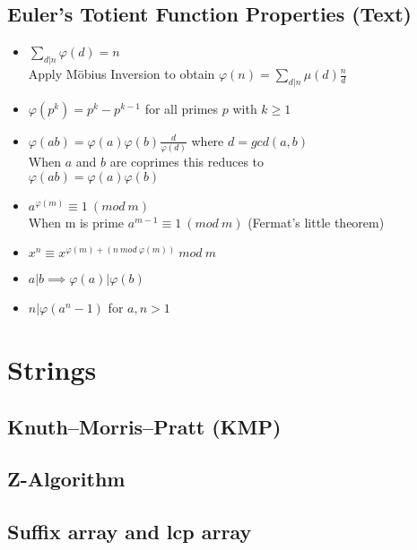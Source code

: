 \documentclass[9pt]{extarticle}
\begin{document}
\begin{multicols*}{3}
\subsection{Euler's Totient Function Properties (Text)}
\begin{itemize}
\item $\displaystyle \sum_{d|n} \varphi(d) = n$ \\
Apply M\"obius Inversion to obtain $\displaystyle \varphi(n) = \sum_{d|n} \mu(d)\frac{n}{d}$
\item $\varphi(p^k) = p^k - p^{k-1}$ for all primes $p$ with $k \geq 1$
\item $\varphi(ab) = \varphi(a)\varphi(b)\frac{d}{\varphi(d)}$ where $d = gcd(a, b)$ \\
When $a$ and $b$ are coprimes this reduces to \\
$\varphi(ab) = \varphi(a)\varphi(b)$
\item $a^{\varphi(m)} \equiv 1 \ (mod \ m)$ \\
When m is prime $a^{m-1} \equiv 1 \ (mod \ m)$ (Fermat's little theorem)
\item $x^n \equiv x^{\varphi(m) + (n \ mod \ \varphi(m))} \ mod \ m$
\item $a | b \implies \varphi(a) | \varphi(b)$
\item $n | \varphi(a^n - 1)$ for $a, n > 1$
\end{itemize}

\section{Strings}

\subsection{Knuth--Morris--Pratt (KMP)}


\subsection{Z-Algorithm}


\subsection{Suffix array and lcp array}



\end{multicols*}
\end{document}
